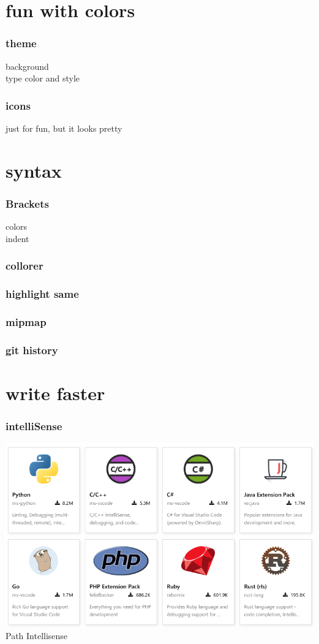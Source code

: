 \documentclass{beamer}
\begin{document}
\section{fun with colors}
\begin{frame}
\frametitle{theme}
background\\
type color and style
\end{frame}

\begin{frame}
\frametitle{icons}
just for fun, but it looks pretty
\end{frame}


\section{syntax}
\begin{frame}
\frametitle{Brackets}
colors\\
indent\\
\end{frame}

\begin{frame}
\frametitle{collorer}
\end{frame}

\begin{frame}
\frametitle{highlight same}
\end{frame}

\begin{frame}
\frametitle{mipmap}
\end{frame}

\begin{frame}
\frametitle{git history}
\end{frame}


\section{write faster}
\begin{frame}
\frametitle{intelliSense}
\includegraphics[scale=0.4]{images/intelisense.png}
Path Intellisense
\end{frame}
\end{document}
